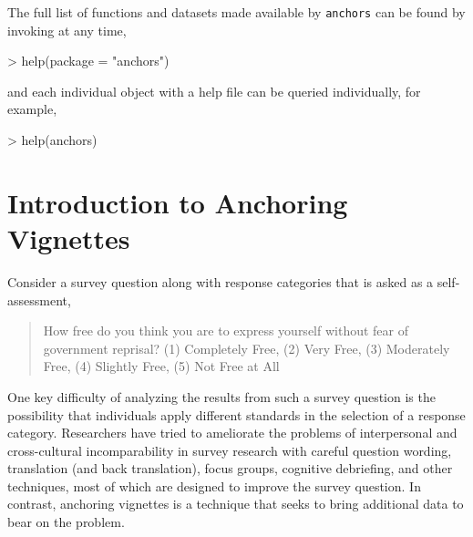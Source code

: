 \documentclass{amsart}
\newcommand{\Ranchors}{{\texttt{anchors}}}
\begin{document}
The full list of functions and datasets made available by \Ranchors
can be found by invoking at any time,
\begin{Schunk}
\begin{Sinput}
> help(package = "anchors")
\end{Sinput}
\end{Schunk}
and each individual object with a help file can be queried
individually, for example,
\begin{Schunk}
\begin{Sinput}
> help(anchors)
\end{Sinput}
\end{Schunk}

\section{Introduction to Anchoring Vignettes}

Consider a survey question along with response categories that is
asked as a self-assessment,
\begin{quote}
 How free do you think you are to express  yourself without fear
of government reprisal?   (1) Completely
  Free, (2) Very Free, (3) Moderately Free, (4) Slightly Free, (5) Not
  Free at All
\end{quote}
One key difficulty of analyzing the results from such a survey
question is the possibility that individuals apply different standards
in the selection of a response category.  Researchers have tried to
ameliorate the problems of interpersonal and cross-cultural
incomparability in survey research with careful question wording,
translation (and back translation), focus groups, cognitive
debriefing, and other techniques, most of which are designed to
improve the survey question. In contrast, anchoring vignettes is a
technique that seeks to bring additional data to bear on the
problem. 
\end{document}
